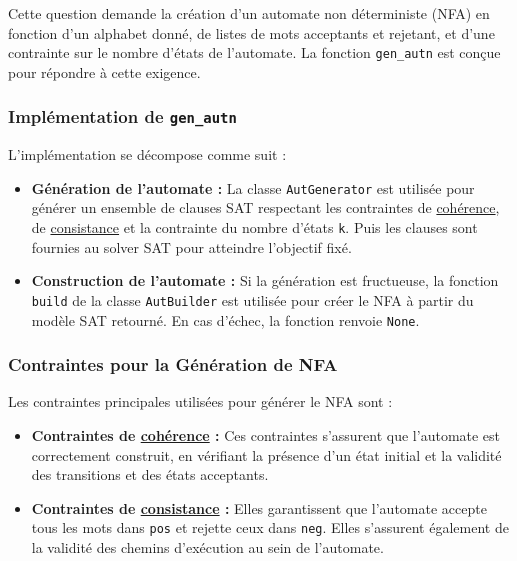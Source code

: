 
Cette question demande la création d'un automate non déterministe (NFA) en fonction d'un alphabet donné, de listes de mots acceptants et rejetant, et d'une contrainte sur le nombre d'états de l'automate. La fonction \texttt{gen\_autn} est conçue pour répondre à cette exigence.

\subsubsection*{Implémentation de \texttt{gen\_autn}}

L'implémentation se décompose comme suit :

\begin{itemize}

        \item \textbf{Génération de l'automate :} La classe \texttt{AutGenerator} est utilisée pour générer un ensemble de clauses SAT respectant les contraintes de \hyperref[cohérence]{cohérence}, de \hyperref[consistance]{consistance} et la contrainte du nombre d'états \texttt{k}. Puis les clauses sont fournies au solver SAT pour atteindre l'objectif fixé. 
    \\
    \item \textbf{Construction de l'automate :} Si la génération est fructueuse, la fonction \texttt{build} de la classe \texttt{AutBuilder} est utilisée pour créer le NFA à partir du modèle SAT retourné. En cas d'échec, la fonction renvoie \texttt{None}.
\end{itemize}

\subsubsection*{Contraintes pour la Génération de NFA}

Les contraintes principales utilisées pour générer le NFA sont :

\begin{itemize}
    \item \textbf{Contraintes de \hyperref[cohérence]{cohérence} :} Ces contraintes s'assurent que l'automate est correctement construit, en vérifiant la présence d'un état initial et la validité des transitions et des états acceptants.\\

    \item \textbf{Contraintes de \hyperref[consistance]{consistance} :} Elles garantissent que l'automate accepte tous les mots dans \texttt{pos} et rejette ceux dans \texttt{neg}. Elles s'assurent également de la validité des chemins d'exécution au sein de l'automate.
\end{itemize}
